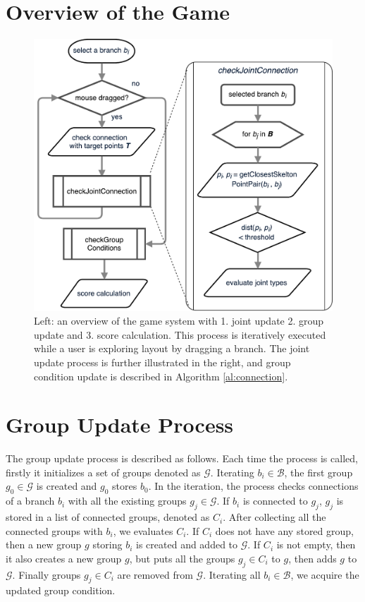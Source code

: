 \documentclass[review]{acmsiggraph}
\begin{document}
 \section{Overview of the Game}
\label{sec:game_flow}
 \begin{figure}[h]
 	\begin{center}
 		\includegraphics[width = 0.35\paperwidth]{images/system/closestPointAlgorithm.pdf}
 		\caption{Left: an overview of the game system with 1. joint update 2. group update and 3. score calculation. This process is iteratively executed while a user is exploring layout by dragging a branch. The joint update process is further illustrated in the right, and group condition update is described in Algorithm \ref{al:connection}. }
 		\label{fig:system_flowchart}
 	\end{center}
 \end{figure}

 \section{Group Update Process}
 \label{sec:group}
 The group update process is described as follows.
 Each time the process is called, firstly it initializes a set of groups denoted as $\mathcal{G}$.
 Iterating $b_i \in \mathcal{B}$, the first group $g_0 \in \mathcal{G}$ is created and $g_0$ stores $b_0$.
 In the iteration, the process checks connections of a branch $b_i$ with all the existing groups $ g_j \in \mathcal{G}$.
 If $b_i$ is connected to $g_j$, $g_j$ is stored in a list of connected groups, denoted as $C_i$.
 After collecting all the connected groups with $b_i$, we evaluates $C_i$.
 If $C_i$ does not have any stored group, then a new group $g$ storing $b_i$ is created and added to $\mathcal{G}$.
 If $C_i$ is not empty, then it also creates a new group $g$, but puts all the groups $g_j \in C_i$ to $g$, then adds $g$ to $\mathcal{G}$.
 Finally groups $g_j \in C_i$ are removed from $\mathcal{G}$.
 Iterating all $b_i \in \mathcal{B}$, we acquire the updated group condition.
\end{document}
